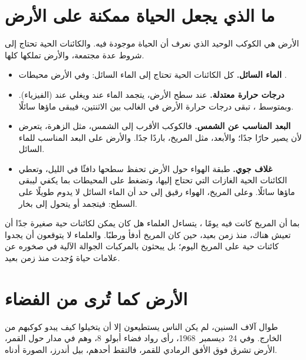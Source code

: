 \section{ما الذي يجعل الحياة ممكنة على الأرض}

الأرض هي الكوكب الوحيد الذي نعرف أن الحياة موجودة فيه. والكائنات الحية
تحتاج إلى شروط عدة مجتمعة، والأرض تملكها كلها.

\begin{itemize}
  \item \textbf{الماء السائل.} كل الكائنات الحية تحتاج إلى الماء السائل:
        وفي الأرض محيطات  .
  \item \textbf{درجات حرارة معتدلة.} عند سطح الأرض، يتجمد الماء
        عند  ويغلي عند  (الفيزياء). وبمتوسط
        ، تبقى درجات حرارة الأرض في الغالب
        بين الاثنتين، فيبقى ماؤها سائلًا.
  \item \textbf{البعد المناسب عن الشمس.} فالكوكب الأقرب إلى الشمس، مثل
        الزهرة، يتعرض لأن يصير حارًا جدًا؛ والأبعد، مثل المريخ، باردًا
        جدًا. والأرض على البعد المناسب للماء السائل.
  \item \textbf{غلاف جوي.} طبقة الهواء حول الأرض تحفظ
        سطحها دافئًا في الليل، وتعطي الكائنات الحية الغازات التي تحتاج إليها،
        وتضغط على المحيطات بما يكفي ليبقى ماؤها سائلًا. وعلى
        المريخ، الهواء رقيق إلى حد أن الماء السائل لا يدوم طويلًا على
        السطح: فيتجمد أو يتحول إلى بخار.
\end{itemize}

\begin{remark}\label{rem:g6:earth-a-planet:mars-life}
بما أن المريخ كانت فيه يومًا  ، يتساءل العلماء هل كان يمكن
لكائنات حية صغيرة جدًا أن تعيش هناك، منذ زمن بعيد، حين كان المريخ أدفأ ورطبًا.
والعلماء لا يتوقعون أن يجدوا كائنات حية على المريخ اليوم؛ بل يبحثون بالمركبات
الجوالة الآلية في صخوره عن علامات حياة وُجدت منذ زمن بعيد.
\end{remark}

\section{الأرض كما تُرى من الفضاء}

طوال آلاف السنين، لم يكن الناس يستطيعون إلا أن يتخيلوا كيف يبدو كوكبهم
من الخارج. وفي 24~ديسمبر~1968، رأى رواد فضاء أبولو~8،
وهم في مدار حول القمر، الأرض تشرق فوق الأفق الرمادي
للقمر، فالتقط أحدهم، بيل أندرز، الصورة أدناه.

